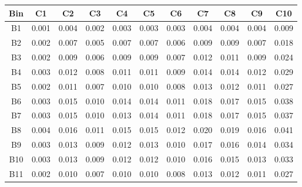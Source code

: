 \begin{tabular}{c@{~~~}c@{~~}c@{~~}c@{~~}c@{~~}c@{~~}c@{~~}c@{~~}c@{~~}c@{~~}c}
\hline 
 \hline 
Bin	& C1 & C2 & C3 & C4 & C5 & C6 & C7 & C8 & C9 & C10 \\ 
\hline 
B1	&  0.001 &  0.004 &  0.002 &  0.003 &  0.003 &  0.003 &  0.004 &  0.004 &  0.004 &  0.009 \\  
B2	&  0.002 &  0.007 &  0.005 &  0.007 &  0.007 &  0.006 &  0.009 &  0.009 &  0.007 &  0.018 \\  
B3	&  0.002 &  0.009 &  0.006 &  0.009 &  0.009 &  0.007 &  0.012 &  0.011 &  0.009 &  0.024 \\  
B4	&  0.003 &  0.012 &  0.008 &  0.011 &  0.011 &  0.009 &  0.014 &  0.014 &  0.012 &  0.029 \\  
B5	&  0.002 &  0.011 &  0.007 &  0.010 &  0.010 &  0.008 &  0.013 &  0.012 &  0.011 &  0.027 \\  
B6	&  0.003 &  0.015 &  0.010 &  0.014 &  0.014 &  0.011 &  0.018 &  0.017 &  0.015 &  0.038 \\  
B7	&  0.003 &  0.015 &  0.010 &  0.013 &  0.014 &  0.011 &  0.018 &  0.017 &  0.015 &  0.037 \\  
B8	&  0.004 &  0.016 &  0.011 &  0.015 &  0.015 &  0.012 &  0.020 &  0.019 &  0.016 &  0.041 \\  
B9	&  0.003 &  0.013 &  0.009 &  0.012 &  0.013 &  0.010 &  0.017 &  0.016 &  0.014 &  0.034 \\  
B10	&  0.003 &  0.013 &  0.009 &  0.012 &  0.012 &  0.010 &  0.016 &  0.015 &  0.013 &  0.033 \\  
B11	&  0.002 &  0.010 &  0.007 &  0.010 &  0.010 &  0.008 &  0.013 &  0.012 &  0.011 &  0.027 \\  
\hline 
 \hline 
\end{tabular}